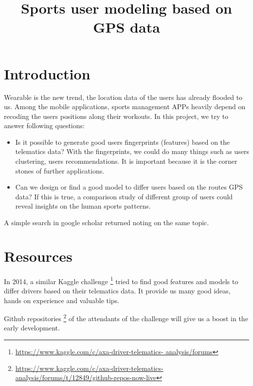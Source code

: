 \documentclass[a4paper,11pt]{article}
\title{Sports user modeling based on GPS data}
\author{}
\date{}
\begin{document}
\maketitle


\section{Introduction}

Wearable is the new trend, the location data of the users has already flooded to us. Among the 
mobile applications, sports management APPs heavily depend on recoding the users positions
along their workouts. In this project, we try to answer following questions:

\begin{itemize}
\item Is it possible to generate good users fingerprints (features) based on the telematics data? 
With the fingerprints, we could do many things such as users clustering, users recommendations.
It is important because it is the corner stones of further applications.
\item Can we design or find a good model to differ users based on the routes GPS data? 
If this is true, a comparison study of different group of users could reveal insights on the 
human sports patterns.
\end{itemize}

A simple search in google scholar returned noting on the same topic. 

\section{Resources}

In 2014, a similar Kaggle challenge \footnote{\url{https://www.kaggle.com/c/axa-driver-telematics-
analysis/forums}} tried to find good features and models to differ drivers based on their telematics
data. It provide us many good ideas,  hands on experience and valuable tips.

Github repositories \footnote{\url{https://www.kaggle.com/c/axa-driver-telematics-analysis/forums/t/12849/github-repos-now-live}} of the attendants of the challenge will give us a boost in the early
development. 




\end{document}
